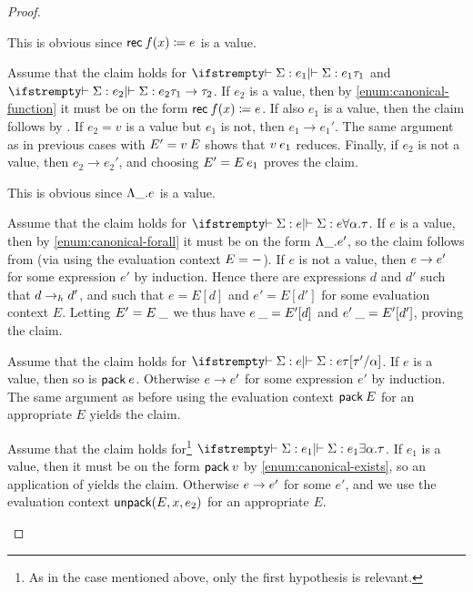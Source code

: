 \begin{proof}
\begin{proofsec}
    \item[\ruleref{Trec}]
    This is obvious since $\expRec{f}{x}{e}$ is a value.

    \item[\ruleref{Tapp}]
    Assume that the claim holds for $\typerel{}{}{\Sigma}{e_1}{\tau_1}$ and $\typerel{}{}{\Sigma}{e_2}{\typeFunc{\tau_1}{\tau_2}}$. If $e_2$ is a value, then by \cref{enum:canonical-function} it must be on the form $\expRec{f}{x}{e}$. If also $e_1$ is a value, then the claim follows by . If $e_2 = v$ is a value but $e_1$ is not, then $e_1 \to e_1'$. The same argument as in previous cases with $E' = \expApp{v}{E}$ shows that $\expApp{v}{e_1}$ reduces. Finally, if $e_2$ is not a value, then $e_2 \to e_2'$, and choosing $E' = \expApp{E}{e_1}$ proves the claim.

    \item[\ruleref{TTlam}]
    This is obvious since $\expForall{\alpha}{e}$ is a value.

    \item[\ruleref{TTapp}]
    Assume that the claim holds for $\typerel{}{}{\Sigma}{e}{\typeForall{\alpha}{\tau}}$. If $e$ is a value, then by \cref{enum:canonical-forall} it must be on the form $\expForall{\alpha}{e'}$, so the claim follows from  (via  using the evaluation context $E = \hole$). If $e$ is not a value, then $e \step e'$ for some expression $e'$ by induction. Hence there are expressions $d$ and $d'$ such that $d \headstep d'$, and such that $e = E[d]$ and $e' = E[d']$ for some evaluation context $E$. Letting $E' = \expTapp{E}{\tau'}$ we thus have $\expTapp{e}{\tau'} = E'[d]$ and $\expTapp{e'}{\tau'} = E'[d']$, proving the claim.

    \item[\ruleref{Tpack}]
    Assume that the claim holds for $\typerel{}{}{\Sigma}{e}{\tau[\tau'/\alpha]}$. If $e$ is a value, then so is $\expPack{e}$. Otherwise $e \step e'$ for some expression $e'$ by induction. The same argument as before using the evaluation context $\expPack{E}$ for an appropriate $E$ yields the claim.

    \item[\ruleref{Tunpack}]
    Assume that the claim holds for\footnote{As in the case  mentioned above, only the first hypothesis is relevant.} $\typerel{}{}{\Sigma}{e_1}{\typeExists{\alpha}{\tau}}$. If $e_1$ is a value, then it must be on the form $\expPack{v}$ by \cref{enum:canonical-exists}, so an application of  yields the claim. Otherwise $e \step e'$ for some $e'$, and we use the evaluation context $\expUnpack{E}{x}{e_2}$ for an appropriate $E$.


\end{proofsec}
\end{proof}
